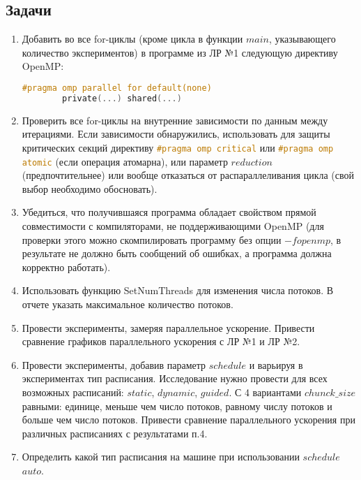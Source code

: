 \documentclass[14pt, a4paper, oneside, final]{extarticle}
\begin{document}
\subsection*{Задачи}
\begin{enumerate}
 \item Добавить во все for-циклы (кроме цикла в функции $main$, указывающего количество экспериментов) в программе из ЛР №1 следующую директиву OpenMP:
\begin{lstlisting}[language=C]
#pragma omp parallel for default(none)
        private(...) shared(...)
 \end{lstlisting}

 \item Проверить все for-циклы на внутренние зависимости по данным между итерациями. Если зависимости обнаружились, использовать для защиты критических секций директиву \lstinline[language=C]{#pragma omp critical} или \lstinline[language=C]{#pragma omp atomic} (если операция атомарна), или параметр $reduction$ (предпочтительнее) или вообще отказаться от распараллеливания цикла (свой выбор необходимо обосновать).

 \item Убедиться, что получившаяся программа обладает свойством прямой совместимости с компиляторами, не поддерживающими OpenMP (для проверки этого можно скомпилировать программу без опции $-fopenmp$, в результате не должно быть сообщений об ошибках, а программа должна корректно работать).

 \item Использовать функцию SetNumThreads для изменения числа потоков. В отчете указать максимальное количество потоков.

 \item Провести эксперименты, замеряя параллельное ускорение. Привести сравнение графиков параллельного ускорения с ЛР №1 и ЛР №2.

 \item Провести эксперименты, добавив параметр $schedule$ и варьируя в экспериментах тип расписания. Исследование нужно провести для всех возможных расписаний: $static$, $dynamic$, $guided$. С 4 вариантами $chunck\_size$ равными: единице, меньше чем число потоков, равному числу потоков и больше чем число потоков. Привести сравнение параллельного ускорения при различных расписаниях с результатами п.4.

 \item Определить какой тип расписания на машине при использовании $schedule$ $auto$.


\end{enumerate}
\end{document}
